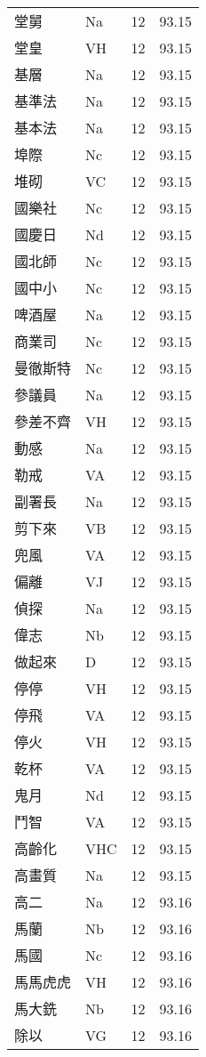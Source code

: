 \documentclass[twocolumn]{book}
\begin{document}
\begin{supertabular}{llrr}
堂舅 & Na & 12 &  93.15\\
堂皇 & VH & 12 &  93.15\\
基層 & Na & 12 &  93.15\\
基準法 & Na & 12 &  93.15\\
基本法 & Na & 12 &  93.15\\
埠際 & Nc & 12 &  93.15\\
堆砌 & VC & 12 &  93.15\\
國樂社 & Nc & 12 &  93.15\\
國慶日 & Nd & 12 &  93.15\\
國北師 & Nc & 12 &  93.15\\
國中小 & Nc & 12 &  93.15\\
啤酒屋 & Na & 12 &  93.15\\
商業司 & Nc & 12 &  93.15\\
曼徹斯特 & Nc & 12 &  93.15\\
參議員 & Na & 12 &  93.15\\
參差不齊 & VH & 12 &  93.15\\
動感 & Na & 12 &  93.15\\
勒戒 & VA & 12 &  93.15\\
副署長 & Na & 12 &  93.15\\
剪下來 & VB & 12 &  93.15\\
兜風 & VA & 12 &  93.15\\
偏離 & VJ & 12 &  93.15\\
偵探 & Na & 12 &  93.15\\
偉志 & Nb & 12 &  93.15\\
做起來 & D & 12 &  93.15\\
停停 & VH & 12 &  93.15\\
停飛 & VA & 12 &  93.15\\
停火 & VH & 12 &  93.15\\
乾杯 & VA & 12 &  93.15\\
鬼月 & Nd & 12 &  93.15\\
鬥智 & VA & 12 &  93.15\\
高齡化 & VHC & 12 &  93.15\\
高畫質 & Na & 12 &  93.15\\
高二 & Na & 12 &  93.16\\
馬蘭 & Nb & 12 &  93.16\\
馬國 & Nc & 12 &  93.16\\
馬馬虎虎 & VH & 12 &  93.16\\
馬大銑 & Nb & 12 &  93.16\\
除以 & VG & 12 &  93.16\\

\end{supertabular}
\end{document}
